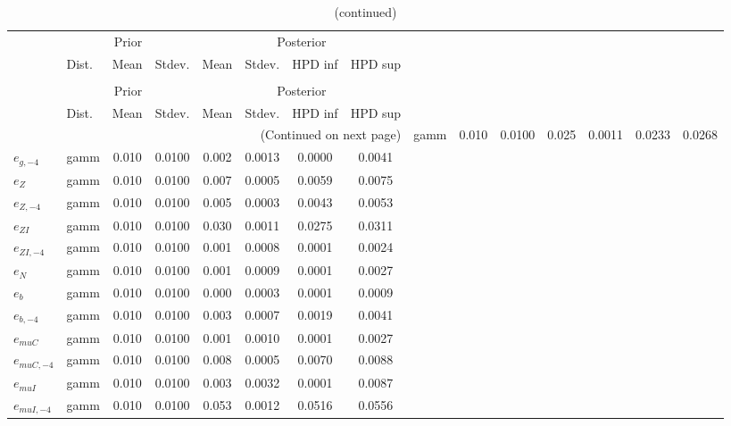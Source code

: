  
\begin{center}
\begin{longtable}{llcccccc} 
\caption{Results from Metropolis-Hastings (standard deviation of structural shocks)}
 \label{Table:MHPosterior:2}\\
\toprule 
  & \multicolumn{3}{c}{Prior}  &  \multicolumn{4}{c}{Posterior} \\
  \cmidrule(r{.75em}){2-4} \cmidrule(r{.75em}){5-8}
  & Dist. & Mean  & Stdev. & Mean & Stdev. & HPD inf & HPD sup\\
\midrule \endfirsthead 
\caption{(continued)}\\\toprule 
  & \multicolumn{3}{c}{Prior}  &  \multicolumn{4}{c}{Posterior} \\
  \cmidrule(r{.75em}){2-4} \cmidrule(r{.75em}){5-8}
  & Dist. & Mean  & Stdev. & Mean & Stdev. & HPD inf & HPD sup\\
\midrule \endhead 
\bottomrule \multicolumn{8}{r}{(Continued on next page)} \endfoot 
\bottomrule \endlastfoot 
${e_g}$ & gamm &   0.010 & 0.0100 &   0.025& 0.0011 &  0.0233 &  0.0268 \\ 
${e_{g,-4}}$ & gamm &   0.010 & 0.0100 &   0.002& 0.0013 &  0.0000 &  0.0041 \\ 
${e_Z}$ & gamm &   0.010 & 0.0100 &   0.007& 0.0005 &  0.0059 &  0.0075 \\ 
${e_{Z,-4}}$ & gamm &   0.010 & 0.0100 &   0.005& 0.0003 &  0.0043 &  0.0053 \\ 
${e_{ZI}}$ & gamm &   0.010 & 0.0100 &   0.030& 0.0011 &  0.0275 &  0.0311 \\ 
${e_{ZI,-4}}$ & gamm &   0.010 & 0.0100 &   0.001& 0.0008 &  0.0001 &  0.0024 \\ 
${e_N}$ & gamm &   0.010 & 0.0100 &   0.001& 0.0009 &  0.0001 &  0.0027 \\ 
${e_b}$ & gamm &   0.010 & 0.0100 &   0.000& 0.0003 &  0.0001 &  0.0009 \\ 
${e_{b,-4}}$ & gamm &   0.010 & 0.0100 &   0.003& 0.0007 &  0.0019 &  0.0041 \\ 
${e_{muC}}$ & gamm &   0.010 & 0.0100 &   0.001& 0.0010 &  0.0001 &  0.0027 \\ 
${e_{muC,-4}}$ & gamm &   0.010 & 0.0100 &   0.008& 0.0005 &  0.0070 &  0.0088 \\ 
${e_{muI}}$ & gamm &   0.010 & 0.0100 &   0.003& 0.0032 &  0.0001 &  0.0087 \\ 
${e_{muI,-4}}$ & gamm &   0.010 & 0.0100 &   0.053& 0.0012 &  0.0516 &  0.0556 \\ 
\end{longtable}
 \end{center}
